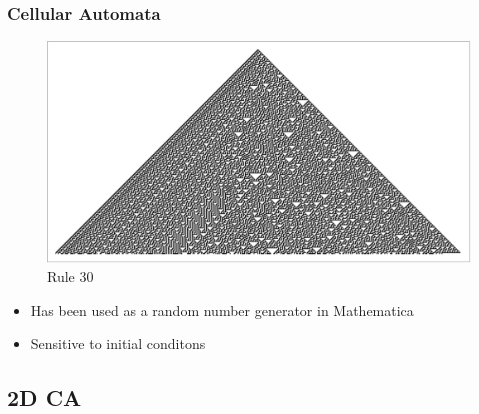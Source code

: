 \documentclass{beamer}
\begin{document}
\begin{frame}
    \frametitle{Cellular Automata}
    \begin{figure}
        \includegraphics[scale=0.8]{rule30.pdf}
        \caption{Rule 30}
    \end{figure}
    \begin{itemize}
        \item Has been used as a random number generator in Mathematica
        \item Sensitive to initial conditons 
    \end{itemize}
\end{frame}
\subsection{2D CA}
\end{document}
